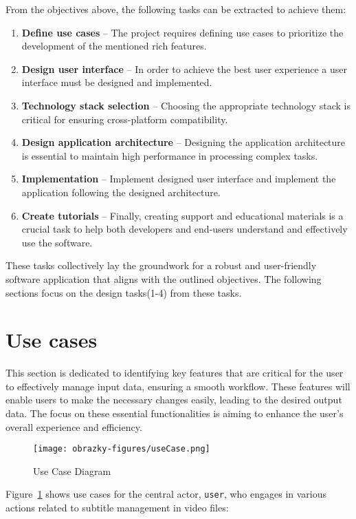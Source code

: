 From the objectives above, the following tasks can be extracted to achieve them:
\begin{enumerate}
\item \textbf{Define use cases} -- The project requires defining use cases to prioritize the development of the mentioned rich features.
\item \textbf{Design user interface} -- In order to achieve the best user experience a user interface must be designed and implemented.
\item \textbf{Technology stack selection} -- Choosing the appropriate technology stack is critical for ensuring cross-platform compatibility.
\item \textbf{Design application architecture} -- Designing the application architecture is essential to maintain high performance in processing complex tasks.
\item \textbf{Implementation} -- Implement designed user interface and implement the application following the designed architecture.
\item \textbf{Create tutorials} --  Finally, creating support and educational materials is a crucial task to help both developers and end-users understand and effectively use the software. 
\end{enumerate}

These tasks collectively lay the groundwork for a robust and user-friendly software application that aligns with the outlined objectives. The following sections focus on the design tasks(1-4) from these tasks.
		
\section{Use cases}
\label{desgin:usecase}

This section is dedicated to identifying key features that are critical for the user to effectively manage input data, ensuring a smooth workflow. These features will enable users to make the necessary changes easily, leading to the desired output data. The focus on these essential functionalities is aiming to enhance the user's overall experience and efficiency.

\begin{figure}[h]
    \centering
    \texttt{[image: obrazky-figures/useCase.png]}
    \caption{Use Case Diagram}
    \label{fig:use:case}
\end{figure}

Figure~\ref{fig:use:case} shows use cases for the central actor, \texttt{user}, who engages in various actions related to subtitle management in video files:

